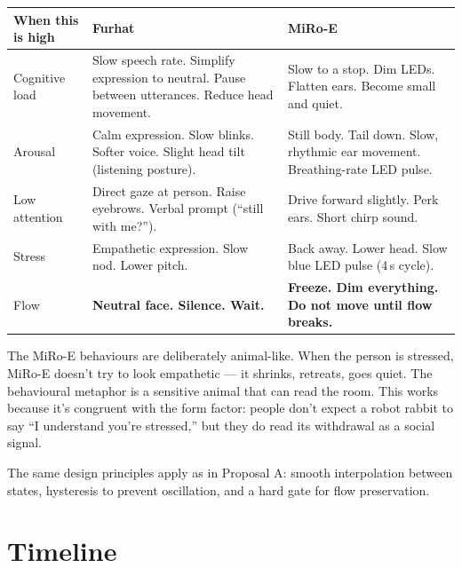 \documentclass[11pt,a4paper]{article}
\begin{document}
\begin{table}[H]
\centering\small
\begin{tabularx}{\textwidth}{lXX}
\toprule
\textbf{When this is high} & \textbf{Furhat} & \textbf{MiRo-E} \\
\midrule
Cognitive load & Slow speech rate. Simplify expression to neutral. Pause between utterances. Reduce head movement. & Slow to a stop. Dim LEDs. Flatten ears. Become small and quiet. \\
Arousal & Calm expression. Slow blinks. Softer voice. Slight head tilt (listening posture). & Still body. Tail down. Slow, rhythmic ear movement. Breathing-rate LED pulse. \\
Low attention & Direct gaze at person. Raise eyebrows. Verbal prompt (``still with me?''). & Drive forward slightly. Perk ears. Short chirp sound. \\
Stress & Empathetic expression. Slow nod. Lower pitch. & Back away. Lower head. Slow blue LED pulse (4\,s cycle). \\
Flow & \textbf{Neutral face. Silence. Wait.} & \textbf{Freeze. Dim everything. Do not move until flow breaks.} \\
\bottomrule
\end{tabularx}
\end{table}

The MiRo-E behaviours are deliberately animal-like. When the person is stressed, MiRo-E doesn't try to look empathetic --- it shrinks, retreats, goes quiet. The behavioural metaphor is a sensitive animal that can read the room. This works because it's congruent with the form factor: people don't expect a robot rabbit to say ``I understand you're stressed,'' but they do read its withdrawal as a social signal.

The same design principles apply as in Proposal A: smooth interpolation between states, hysteresis to prevent oscillation, and a hard gate for flow preservation.

\section{Timeline}
\end{document}
